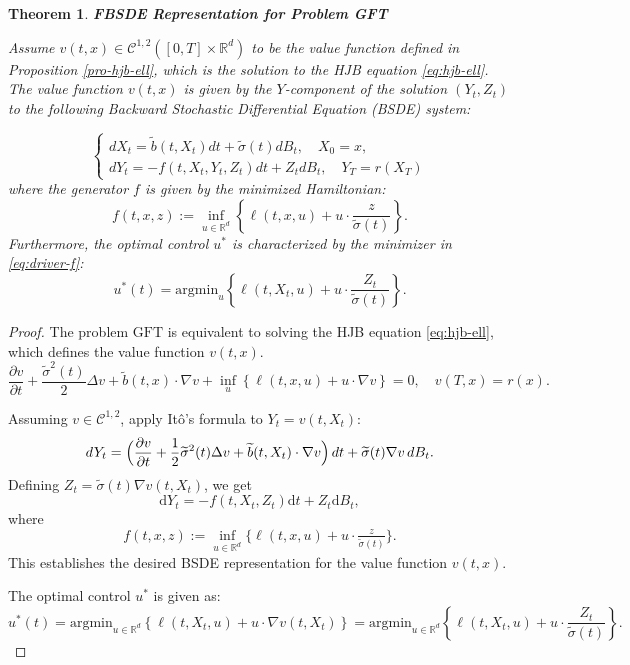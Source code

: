 \documentclass[11pt]{article}
\newtheorem{theorem}{Theorem}[section]
\def\w{\widetilde}
\begin{document}
\begin{theorem}
\label{thm:fbsde}
\textbf{FBSDE Representation for Problem GFT}

Assume $v(t,x)\in\mathcal{C}^{1,2}([0,T]\times\mathbb{R}^d)$ to be the value function defined in Proposition \ref{pro-hjb-ell}, which is the solution to the HJB equation \eqref{eq:hjb-ell}. The value function $v(t,x)$ is given by the $Y$-component of the solution $(Y_t, Z_t)$ to the following Backward Stochastic Differential Equation (BSDE) system:

\begin{equation}
\begin{cases}
dX_t =\w{b}(t, X_t) dt +\w{\sigma}(t) dB_t, \quad X_0=x,\\
dY_t = -f(t, X_t, Y_t, Z_t) dt + Z_t  dB_t, \quad Y_T = r(X_T)
\end{cases}
\end{equation}
where the generator $f$ is given by the minimized Hamiltonian:
\begin{equation}
\label{eq:driver-f}
f(t,x,z) := \inf_{u \in \mathbb{R}^d} \left\{ \ell(t,x,u) + u \cdot \frac{z}{ \w{\sigma}(t)} \right\}.
\end{equation}
Furthermore, the optimal control $u^*$ is characterized by the minimizer in \eqref{eq:driver-f}:
\begin{equation}
u^*(t) = \mathrm{argmin}_{u} \left\{ \ell(t,X_t,u) + u \cdot \frac{Z_t}{ \w{\sigma}(t)} \right\}.
\end{equation}
\end{theorem}

\begin{proof}
The problem $\text{GFT}$ is equivalent to solving the HJB equation \eqref{eq:hjb-ell}, which defines the value function $v(t,x)$.
$$
\frac{\partial v}{\partial t} + \frac{\w{\sigma}^2(t)}{2} \Delta v +\w{b} (t,x) \cdot \nabla v + \inf_{u} \left\{ \ell(t,x,u) + u \cdot \nabla v \right\} = 0, \quad v(T,x) = r(x).
$$

Assuming $v\in\mathcal{C}^{1,2}$, apply Itô’s formula to $Y_t=v(t,X_t)$:
$$
dY_t = 
\Bigl(
\frac{\partial v}{\partial t}
+ \frac{1}{2}\w\sigma^2(t)\Delta v
+ \w b(t,X_t)\cdot\nabla v
\Bigr)\,dt 
+ \w\sigma(t)\nabla v\,dB_t.
$$
Defining $Z_t=\w\sigma(t)\nabla v(t,X_t)$, we get
$$
\mathrm{d}Y_t = -f(t, X_t, Z_t) \mathrm{d}t + Z_t \mathrm{d}B_t,
$$
where 
$$
f(t,x,z):=\inf_{u\in\mathbb{R}^d}\bigl\{\ell(t,x,u)+u\cdot\tfrac{z}{\w\sigma(t)}\bigr\}.
$$
This establishes the desired BSDE representation for the value function $v(t,x)$.

The optimal control $u^*$ is given as:
$$
u^*(t) = \mathrm{argmin}_{u\in\mathbb{R}^d} \left\{ \ell(t,X_t,u) + u \cdot \nabla v(t, X_t) \right\} = \mathrm{argmin}_{u\in\mathbb{R}^d} \left\{ \ell(t,X_t,u) + u \cdot \frac{Z_t}{\w{\sigma}(t)} \right\}.
$$
\end{proof}
\end{document}
